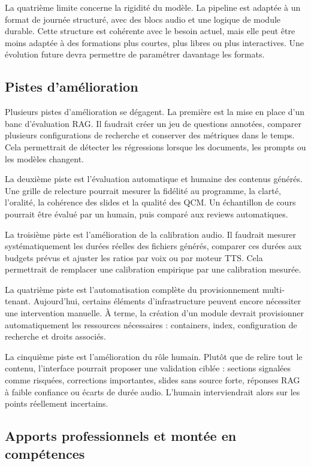 \documentclass[12pt,a4paper]{article}
\begin{document}
La quatrième limite concerne la rigidité du modèle. La pipeline est adaptée à un format
de journée structuré, avec des blocs audio et une logique de module durable. Cette
structure est cohérente avec le besoin actuel, mais elle peut être moins adaptée à des
formations plus courtes, plus libres ou plus interactives. Une évolution future devra
permettre de paramétrer davantage les formats.

\subsection{Pistes d'amélioration}

Plusieurs pistes d'amélioration se dégagent. La première est la mise en place d'un banc
d'évaluation RAG. Il faudrait créer un jeu de questions annotées, comparer plusieurs
configurations de recherche et conserver des métriques dans le temps. Cela permettrait
de détecter les régressions lorsque les documents, les prompts ou les modèles changent.

La deuxième piste est l'évaluation automatique et humaine des contenus générés. Une
grille de relecture pourrait mesurer la fidélité au programme, la clarté, l'oralité, la
cohérence des slides et la qualité des QCM. Un échantillon de cours pourrait être évalué
par un humain, puis comparé aux reviews automatiques.

La troisième piste est l'amélioration de la calibration audio. Il faudrait mesurer
systématiquement les durées réelles des fichiers générés, comparer ces durées aux
budgets prévus et ajuster les ratios par voix ou par moteur TTS. Cela permettrait de
remplacer une calibration empirique par une calibration mesurée.

La quatrième piste est l'automatisation complète du provisionnement multi-tenant.
Aujourd'hui, certains éléments d'infrastructure peuvent encore nécessiter une intervention
manuelle. À terme, la création d'un module devrait provisionner automatiquement les
ressources nécessaires : containers, index, configuration de recherche et droits associés.

La cinquième piste est l'amélioration du rôle humain. Plutôt que de relire tout le contenu,
l'interface pourrait proposer une validation ciblée : sections signalées comme risquées,
corrections importantes, slides sans source forte, réponses RAG à faible confiance ou
écarts de durée audio. L'humain interviendrait alors sur les points réellement incertains.

\subsection{Apports professionnels et montée en compétences}
\end{document}
